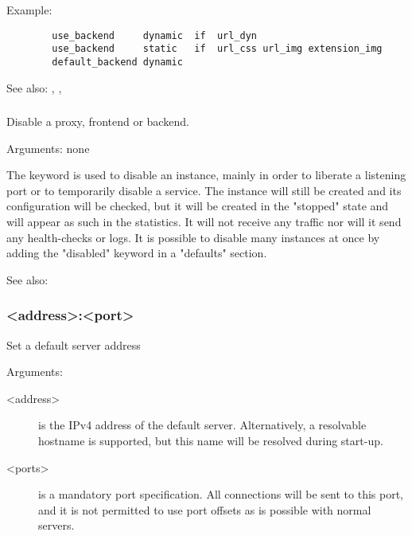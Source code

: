   Example:
  \begin{verbatim}
        use_backend     dynamic  if  url_dyn
        use_backend     static   if  url_css url_img extension_img
        default_backend dynamic
  \end{verbatim}

  See also: , , 

\subsubsection[disabled]{}

  Disable a proxy, frontend or backend.
  

  Arguments: none

  The  keyword is used to disable an instance, mainly in order to
  liberate a listening port or to temporarily disable a service. The instance
  will still be created and its configuration will be checked, but it will be
  created in the "stopped" state and will appear as such in the statistics. It
  will not receive any traffic nor will it send any health-checks or logs. It
  is possible to disable many instances at once by adding the "disabled"
  keyword in a "defaults" section.

  See also: 

\subsubsection[dispatch]{ <address>:<port>}

  Set a default server address
  
  
  Arguments:
  \begin{description}
  \item[<address>] is the IPv4 address of the default server. Alternatively, a
              resolvable hostname is supported, but this name will be resolved
              during start-up.

  \item[<ports>]   is a mandatory port specification. All connections will be sent
              to this port, and it is not permitted to use port offsets as is
              possible with normal servers.
  \end{description}

